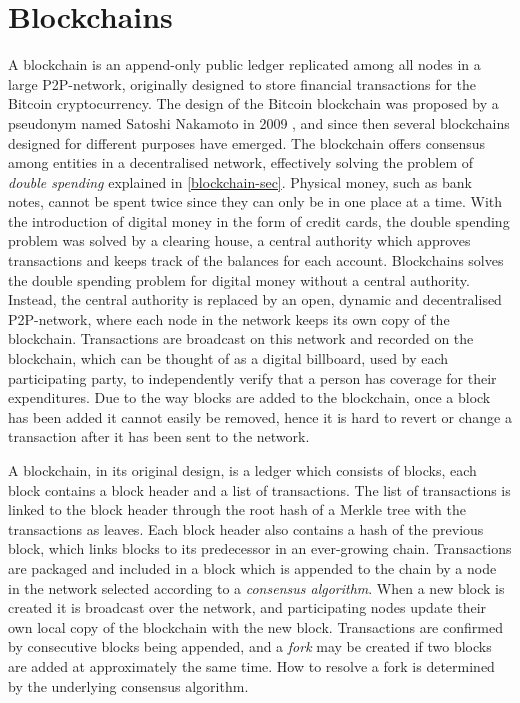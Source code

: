 \documentclass{style/kththesis}
\begin{document}
\section{Blockchains}
A blockchain is an append-only public ledger replicated among all nodes in a large P2P-network, originally designed to store financial transactions for the Bitcoin cryptocurrency. The design of the Bitcoin blockchain was proposed by a pseudonym named Satoshi Nakamoto in 2009 \cite{Nakamoto08}, and since then several blockchains designed for different purposes have emerged. The blockchain offers consensus among entities in a decentralised network, effectively solving the problem of \emph{double spending} explained in \cref{blockchain-sec}. Physical money, such as bank notes, cannot be spent twice since they can only be in one place at a time. With the introduction of digital money in the form of credit cards, the double spending problem was solved by a clearing house, a central authority which approves transactions and keeps track of the balances for each account. Blockchains solves the double spending problem for digital money without a central authority. Instead, the central authority is replaced by an open, dynamic and decentralised P2P-network, where each node in the network keeps its own copy of the blockchain. Transactions are broadcast on this network and recorded on the blockchain, which can be thought of as a digital billboard, used by each participating party, to independently verify that a person has coverage for their expenditures. Due to the way blocks are added to the blockchain, once a block has been added it cannot easily be removed, hence it is hard to revert or change a transaction after it has been sent to the network.

A blockchain, in its original design, is a ledger which consists of blocks, each block contains a block header and a list of transactions. The list of transactions is linked to the block header through the root hash of a Merkle tree with the transactions as leaves. Each block header also contains a hash of the previous block, which links blocks to its predecessor in an ever-growing chain. Transactions are packaged and included in a block which is appended to the chain by a node in the network selected according to a \emph{consensus algorithm}. When a new block is created it is broadcast over the network, and participating nodes update their own local copy of the blockchain with the new block. Transactions are confirmed by consecutive blocks being appended, and a \emph{fork} may be created if two blocks are added at approximately the same time. How to resolve a fork is determined by the underlying consensus algorithm.
\end{document}
